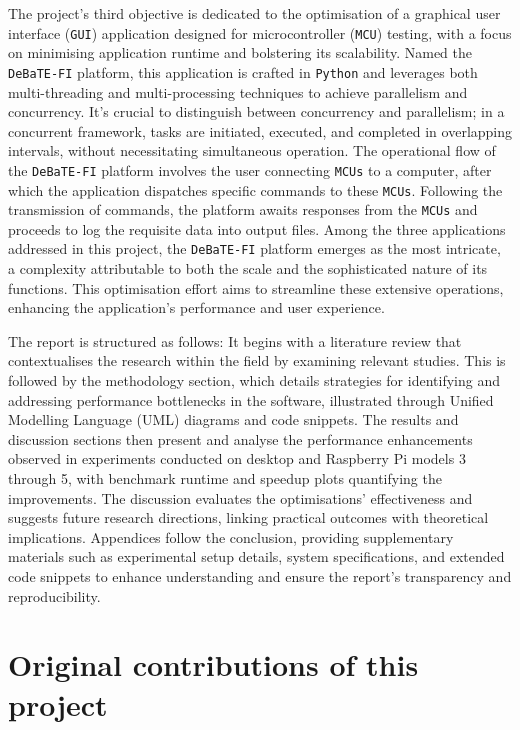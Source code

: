 \documentclass[12pt, openany]{book}
\begin{document}
The project's third objective is dedicated to the optimisation of a graphical user interface (\texttt{GUI}) application designed for microcontroller (\texttt{MCU}) testing, with a focus on minimising application runtime and bolstering its scalability. Named the \texttt{DeBaTE-FI} platform\cite{debate_fi_publication}, this application is crafted in \texttt{Python} and leverages both multi-threading and multi-processing techniques to achieve parallelism and concurrency. It's crucial to distinguish between concurrency and parallelism; in a concurrent framework, tasks are initiated, executed, and completed in overlapping intervals, without necessitating simultaneous operation. The operational flow of the \texttt{DeBaTE-FI} platform involves the user connecting \texttt{MCUs} to a computer, after which the application dispatches specific commands to these \texttt{MCUs}. Following the transmission of commands, the platform awaits responses from the \texttt{MCUs} and proceeds to log the requisite data into output files. Among the three applications addressed in this project, the \texttt{DeBaTE-FI} platform emerges as the most intricate, a complexity attributable to both the scale and the sophisticated nature of its functions. This optimisation effort aims to streamline these extensive operations, enhancing the application's performance and user experience.

The report is structured as follows: It begins with a literature review that contextualises the research within the field by examining relevant studies. This is followed by the methodology section, which details strategies for identifying and addressing performance bottlenecks in the software, illustrated through Unified Modelling Language (UML) diagrams and code snippets. The results and discussion sections then present and analyse the performance enhancements observed in experiments conducted on desktop and Raspberry Pi models 3 through 5, with benchmark runtime and speedup plots quantifying the improvements. The discussion evaluates the optimisations' effectiveness and suggests future research directions, linking practical outcomes with theoretical implications. Appendices follow the conclusion, providing supplementary materials such as experimental setup details, system specifications, and extended code snippets to enhance understanding and ensure the report's transparency and reproducibility.


\section{Original contributions of this project}
\end{document}
